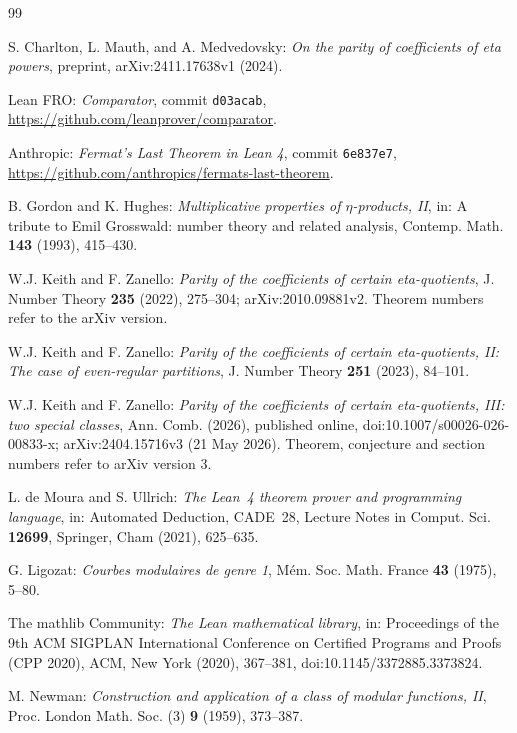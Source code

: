 \documentclass[12pt]{amsart}
\theoremstyle{definition}
\begin{document}
\clearpage
\begin{thebibliography}{99}
\raggedright

 S. Charlton, L. Mauth, and A. Medvedovsky: \emph{On the parity of coefficients of eta powers}, preprint, arXiv:2411.17638v1 (2024).

 Lean FRO: \emph{Comparator}, commit \texttt{d03acab}, \url{https://github.com/leanprover/comparator}.

 Anthropic: \emph{Fermat's Last Theorem in Lean 4}, commit \texttt{6e837e7}, \url{https://github.com/anthropics/fermats-last-theorem}.

 B. Gordon and K. Hughes: \emph{Multiplicative properties of $\eta$-products, II}, in: A tribute to Emil Grosswald: number theory and related analysis, Contemp. Math. \textbf{143} (1993), 415--430.

 W.J. Keith and F. Zanello: \emph{Parity of the coefficients of certain eta-quotients}, J. Number Theory \textbf{235} (2022), 275--304; arXiv:2010.09881v2. Theorem numbers refer to the arXiv version.

 W.J. Keith and F. Zanello: \emph{Parity of the coefficients of certain eta-quotients, II: The case of even-regular partitions}, J. Number Theory \textbf{251} (2023), 84--101.

 W.J. Keith and F. Zanello: \emph{Parity of the coefficients of certain eta-quotients, III: two special classes}, Ann. Comb. (2026), published online, doi:10.1007/s00026-026-00833-x; arXiv:2404.15716v3 (21 May 2026). Theorem, conjecture and section numbers refer to arXiv version 3.

 L. de Moura and S. Ullrich: \emph{The Lean~4 theorem prover and programming language}, in: Automated Deduction, CADE~28, Lecture Notes in Comput. Sci. \textbf{12699}, Springer, Cham (2021), 625--635.

 G. Ligozat: \emph{Courbes modulaires de genre 1}, M\'em. Soc. Math. France \textbf{43} (1975), 5--80.

 The mathlib Community: \emph{The Lean mathematical library}, in: Proceedings of the 9th ACM SIGPLAN International Conference on Certified Programs and Proofs (CPP 2020), ACM, New York (2020), 367--381, doi:10.1145/3372885.3373824.

 M. Newman: \emph{Construction and application of a class of modular functions, II}, Proc. London Math. Soc. (3) \textbf{9} (1959), 373--387.


\end{thebibliography}
\end{document}
